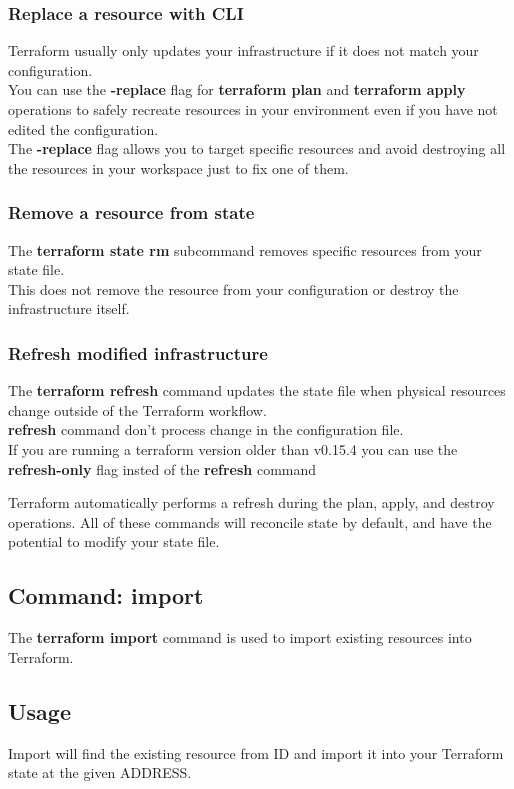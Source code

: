 \documentclass[12pt, letterpaper, twoside]{article}
\begin{document}
\subsubsection{Replace a resource with CLI}
Terraform usually only updates your infrastructure if it does not match your 
configuration.\\
You can use the \textbf{-replace} flag for \textbf{terraform plan} and 
\textbf{terraform apply} operations to safely recreate resources in your environment 
even if you have not edited the configuration.\\
The \textbf{-replace} flag allows you to target specific resources and avoid 
destroying all the resources in your workspace just to fix one of them.\\

\subsubsection{Remove a resource from state}
The \textbf{terraform state rm} subcommand removes specific resources from 
your state file.\\
This does not remove the resource from your configuration or destroy the 
infrastructure itself.

\subsubsection{Refresh modified infrastructure}
The \textbf{terraform refresh} command updates the state file when physical 
resources change outside of the Terraform workflow.\\
\textbf{refresh} command don't process change in the configuration file.\\
If you are running a terraform version older than v0.15.4 you can use the \textbf{refresh-only}
flag insted of the \textbf{refresh} command

Terraform automatically performs a refresh during the plan, apply, and destroy 
operations. All of these commands will reconcile state by default, and have 
the potential to modify your state file.

\subsection{Command: import}
The \textbf{terraform import} command is used to import existing resources into Terraform.

\subsection{Usage}
Import will find the existing resource from ID and import it into your Terraform state 
at the given ADDRESS.
\end{document}

